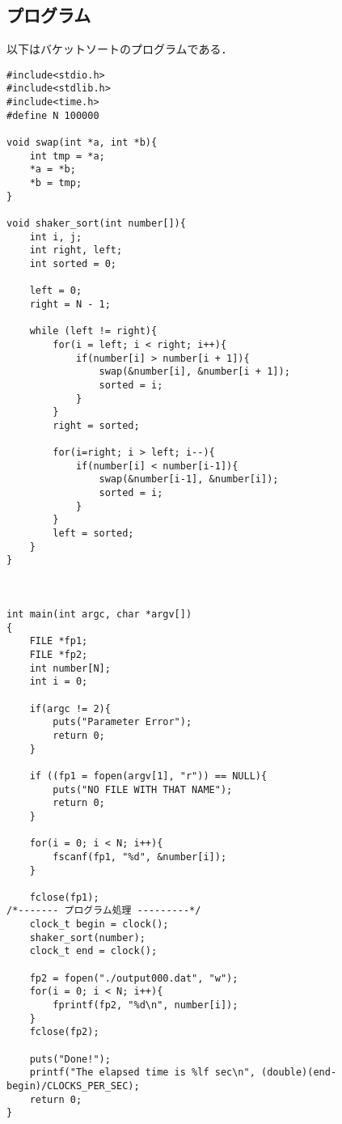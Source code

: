 \documentclass[a4j, titlepage]{jarticle}
\begin{document}
\subsection{プログラム}
以下はバケットソートのプログラムである．\vspace{5pt}
\begin{lstlisting}[basicstyle=\ttfamily\footnotesize, frame=trbl]
#include<stdio.h>
#include<stdlib.h>
#include<time.h>
#define N 100000

void swap(int *a, int *b){
    int tmp = *a;
    *a = *b;
    *b = tmp;
}

void shaker_sort(int number[]){
    int i, j;
    int right, left;
    int sorted = 0;

    left = 0;
    right = N - 1;

    while (left != right){
        for(i = left; i < right; i++){
            if(number[i] > number[i + 1]){
                swap(&number[i], &number[i + 1]);
                sorted = i;
            }
        }
        right = sorted;

        for(i=right; i > left; i--){
            if(number[i] < number[i-1]){
                swap(&number[i-1], &number[i]);
                sorted = i;
            }
        }
        left = sorted;
    }    
}



int main(int argc, char *argv[])
{
    FILE *fp1;
    FILE *fp2;
    int number[N];
    int i = 0;

    if(argc != 2){                         
        puts("Parameter Error");
        return 0;
    }

    if ((fp1 = fopen(argv[1], "r")) == NULL){
        puts("NO FILE WITH THAT NAME");
        return 0;
    }

    for(i = 0; i < N; i++){
        fscanf(fp1, "%d", &number[i]);
    }

    fclose(fp1);
/*------- プログラム処理 ---------*/
    clock_t begin = clock();
    shaker_sort(number);
    clock_t end = clock();

    fp2 = fopen("./output000.dat", "w");
    for(i = 0; i < N; i++){
        fprintf(fp2, "%d\n", number[i]);
    }
    fclose(fp2);

    puts("Done!");
    printf("The elapsed time is %lf sec\n", (double)(end-begin)/CLOCKS_PER_SEC);
    return 0;
}

\end{lstlisting}
\end{document}
